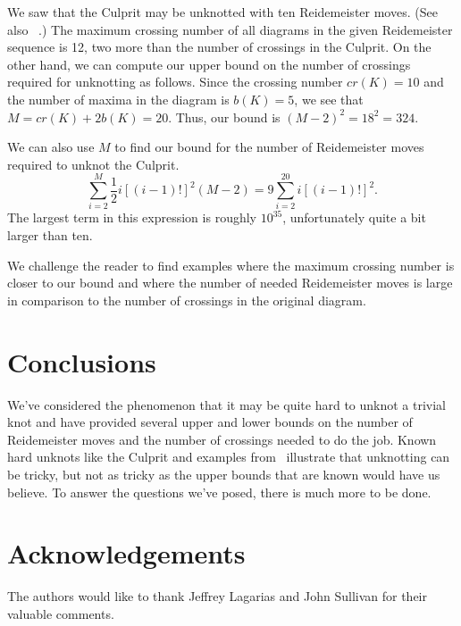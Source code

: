 \documentclass{amsart}
\begin{document}
We saw that the Culprit may be unknotted with ten Reidemeister moves. (See also ~\cite{KL}.) The maximum crossing number of all diagrams in the given Reidemeister sequence is 12, two more than the number of crossings in the Culprit. On the other hand, we can compute our upper bound on the number of crossings required for unknotting as follows. Since the crossing number $cr(K)=10$ and the number of maxima in the diagram is $b(K)=5$, we see that $M = cr(K) + 2b(K)=20$. Thus, our bound is $(M-2)^2=18^2=324.$ 

We can also use $M$ to find our bound for the number of Reidemeister moves required to unknot the Culprit. $$\sum_{i=2}^M\frac{1}{2}i[(i-1)!]^2(M-2)=9\sum_{i=2}^{20}i[(i-1)!]^2.$$ The largest term in this expression is roughly $10^{35}$, unfortunately quite a bit larger than ten.

We challenge the reader to find examples where the maximum crossing number is closer to our bound and where the number of needed Reidemeister moves is large in comparison to the number of crossings in the original diagram.

\section{Conclusions}

We've considered the phenomenon that it may be quite hard to unknot a trivial knot and have provided several upper and lower bounds on the number of Reidemeister moves and the number of crossings needed to do the job. Known hard unknots like the Culprit and examples from~\cite{hn} illustrate that unknotting can be tricky, but not as tricky as the upper bounds that are known would have us believe. To answer the questions we've posed, there is much more to be done.

\section{Acknowledgements}

The authors would like to thank Jeffrey Lagarias and John Sullivan for their valuable comments.




\end{document}
